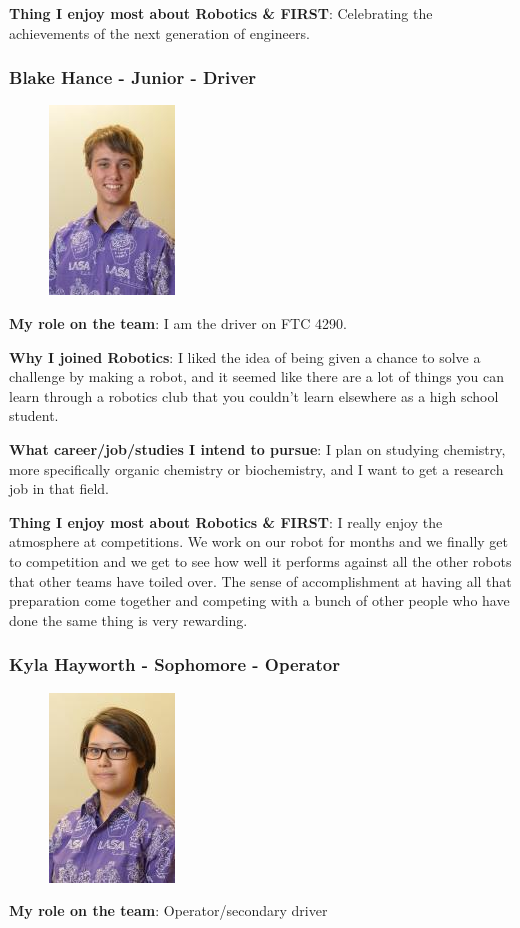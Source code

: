 {\bf Thing I enjoy most about Robotics \& FIRST}: Celebrating the achievements of the next generation of engineers.

\subsubsection{Blake Hance - Junior - Driver} 
\begin{figure}[H]
	\includegraphics[width=0.2\linewidth]{blake}
\end{figure}
{\bf My role on the team}: I am the driver on FTC 4290.

{\bf Why I joined Robotics}: I liked the idea of being given a chance to solve a challenge by making a robot, and it seemed like there are a lot of things you can learn through a robotics club that you couldn't learn elsewhere as a high school student.

{\bf What career/job/studies I intend to pursue}: I plan on studying chemistry, more specifically organic chemistry or biochemistry, and I want to get a research job in that field.

{\bf Thing I enjoy most about Robotics \& FIRST}: I really enjoy the atmosphere at competitions. We work on our robot for months and we finally get to competition and we get to see how well it performs against all the other robots that other teams have toiled over. The sense of accomplishment at having all that preparation come together and competing with a bunch of other people who have done the same thing is very rewarding.

\subsubsection{Kyla Hayworth - Sophomore - Operator} 
\begin{figure}[H]
	\includegraphics[width=0.2\linewidth]{kyla}
\end{figure}
{\bf My role on the team}: Operator/secondary driver

